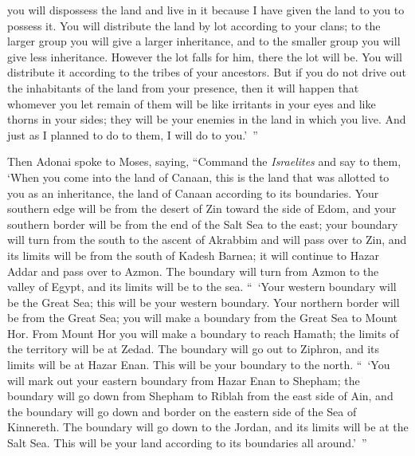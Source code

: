 \begin{biblechapter}
\verse you will dispossess the land and live in it because I have given the land to you to possess it.
\verse You will distribute the land by lot according to your clans; to the larger group you will give a larger inheritance, and to the smaller group you will give less inheritance. However the lot falls for him, there the lot will be. You will distribute it according to the tribes of your ancestors.
\verse But if you do not drive out the inhabitants of the land from your presence, then it will happen that whomever you let remain of them will be like irritants in your eyes and like thorns in your sides; they will be your enemies in the land in which you live.
\verse And just as I planned to do to them, I will do to you.’ ”
\end{biblechapter}

\begin{biblechapter} %
 Then Adonai spoke to Moses, saying,
\verse “Command the \textit{Israelites} and say to them, ‘When you come into the land of Canaan, this is the land that was allotted to you as an inheritance, the land of Canaan according to its boundaries.
\verse Your southern edge will be from the desert of Zin toward the side of Edom, and your southern border will be from the end of the Salt Sea to the east;
\verse your boundary will turn from the south to the ascent of Akrabbim and will pass over to Zin, and its limits will be from the south of Kadesh Barnea; it will continue to Hazar Addar and pass over to Azmon.
\verse The boundary will turn from Azmon to the valley of Egypt, and its limits will be to the sea.
\verse “ ‘Your western boundary will be the Great Sea; this will be your western boundary.
\verse Your northern border will be from the Great Sea; you will make a boundary from the Great Sea to Mount Hor.
\verse From Mount Hor you will make a boundary to reach Hamath; the limits of the territory will be at Zedad.
\verse The boundary will go out to Ziphron, and its limits will be at Hazar Enan. This will be your boundary to the north.
\verse “ ‘You will mark out your eastern boundary from Hazar Enan to Shepham;
\verse the boundary will go down from Shepham to Riblah from the east side of Ain, and the boundary will go down and border on the eastern side of the Sea of Kinnereth.
\verse The boundary will go down to the Jordan, and its limits will be at the Salt Sea. This will be your land according to its boundaries all around.’ ”

\end{biblechapter}
